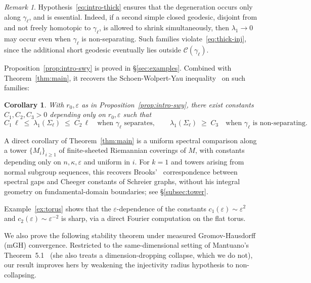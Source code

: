 \documentclass[10pt,reqno]{amsart}
\newtheorem{corollary}[theorem]{Corollary}
\theoremstyle{remark}
\newtheorem{remark}[theorem]{Remark}
\begin{document}
\begin{remark}
\label{rem:scope}
Hypothesis~\eqref{eq:intro-thick} ensures that the degeneration occurs
only along $\gamma_\ell$, and is essential. Indeed, if a second simple
closed geodesic, disjoint from and not freely homotopic to
$\gamma_\ell$, is allowed to shrink simultaneously, then
$\lambda_1\to0$ may occur even when $\gamma_\ell$ is non-separating.
Such families violate~\eqref{eq:thick-inj}, since the additional short
geodesic eventually lies outside $\mathcal C(\gamma_\ell)$.
\end{remark}

Proposition~\ref{prop:intro-swy} is proved in
\S\ref{sec:examples}. Combined
with Theorem~\ref{thm:main}, it recovers the Schoen-Wolpert-Yau
inequality~\cite{SchoenWolpertYau1980} on such families:

\begin{corollary}
\label{cor:intro-swy}
With $r_0,\varepsilon$ as in Proposition~\ref{prop:intro-swy}, there
exist constants $C_1,C_2,C_3>0$ depending only on $r_0,\varepsilon$
such that
\[
C_1\,\ell \;\le\; \lambda_1(\Sigma_\ell) \;\le\; C_2\,\ell
\quad\text{when $\gamma_\ell$ separates},
\qquad
\lambda_1(\Sigma_\ell) \;\ge\; C_3
\quad\text{when $\gamma_\ell$ is non-separating.}
\]
\end{corollary}

A direct corollary of Theorem~\ref{thm:main} is a uniform spectral
comparison along a tower $\{M_i\}_{i\geq1}$ of finite-sheeted
Riemannian coverings of $M$, with constants depending only on
$n,\kappa,\varepsilon$ and uniform in $i$. For $k=1$ and towers
arising from normal subgroup sequences, this recovers
Brooks'~\cite{Brooks1986} correspondence between spectral gaps and
Cheeger constants of Schreier graphs, without his integral geometry on
fundamental-domain boundaries; see 
\S\ref{subsec:tower}.

Example~\ref{ex:torus} shows that the $\varepsilon$-dependence of the
constants $c_1(\varepsilon)\sim\varepsilon^2$ and
$c_2(\varepsilon)\sim\varepsilon^{-2}$ is sharp, via a direct Fourier
computation on the flat torus.

We also prove the following stability theorem under
measured Gromov-Hausdorff (mGH) convergence. Restricted to the
same-dimensional setting of Mantuano's Theorem~5.1~\cite{Mantuano2005}
(she also treats a dimension-dropping collapse, which we do not), our
result improves hers by weakening the injectivity radius hypothesis
to non-collapsing.
\end{document}
